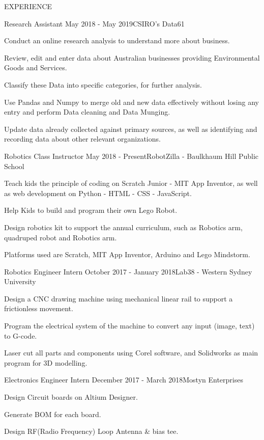 \documentclass{resume} %
\begin{document}
\begin{rSection}{EXPERIENCE}
\begin{rSubsection}{Research Assistant} {May 2018 - May 2019}{\faInstitution CSIRO's Data61}{}
\item Conduct an online research analysis to understand more about business.
\item Review, edit and enter data about Australian businesses providing Environmental Goods and Services.    
\item Classify these Data into specific categories, for further analysis.
\item Use Pandas and Numpy to merge old and new data effectively without losing any entry and perform Data cleaning and Data Munging.
\item Update data already collected against primary sources, as well as identifying and recording data about other relevant organizations.
\end{rSubsection}

\begin{rSubsection}{Robotics Class Instructor} {May 2018 - Present}{\faInstitution RobotZilla - Baulkhaum Hill Public School}{}
\item  Teach kids the principle of coding on Scratch Junior - MIT App Inventor, as well as web development on Python - HTML - CSS - JavaScript.
\item Help Kids to build and program their own Lego Robot.
\item Design robotics kit to support the annual curriculum, such as Robotics arm, quadruped robot and Robotics arm.
\item Platforms used are Scratch, MIT App Inventor, Arduino and Lego Mindstorm.
\end{rSubsection}

\begin{rSubsection}{Robotics Engineer Intern} {October 2017 - January 2018}{\faInstitution Lab38 - Western Sydney University}{}
\item Design a CNC drawing machine using mechanical linear rail to support a frictionless movement.
\item Program the electrical system of the machine to convert any input (image, text) to G-code.
\item Laser cut all parts and components using Corel software, and Solidworks as main program for 3D modelling.
\end{rSubsection}

\begin{rSubsection}{Electronics Engineer Intern} {December 2017 - March 2018}{\faInstitution Mostyn Enterprises}{}
\item  Design Circuit boards on Altium Designer.
\item Generate BOM for each board.
\item Design RF(Radio Frequency) Loop Antenna \& bias tee.
\end{rSubsection}

\end{rSection}  
\end{document}
